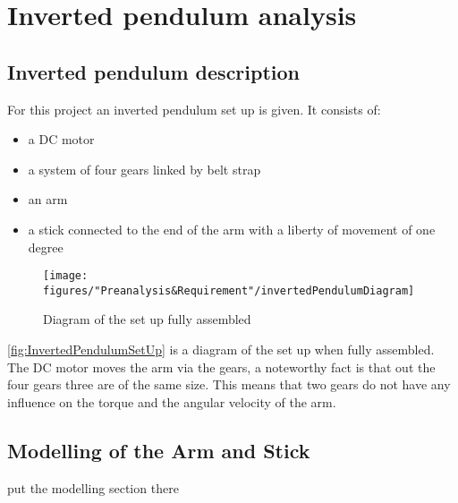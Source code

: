 \chapter{Inverted pendulum analysis}


\section{Inverted pendulum description}
For this project an inverted pendulum set up is given. It consists of:
\begin{itemize}
	\item a DC motor
	\item a system of four gears linked by belt strap
	\item an arm
	\item a stick connected to the end of the arm with a liberty of movement of one degree
\end{itemize}

\begin{figure} [htbp]
	\centering
	\texttt{[image: figures/"Preanalysis\&Requirement"/invertedPendulumDiagram]}
	\caption{Diagram of the set up fully assembled} \label{fig:InvertedPendulumSetUp}
\end{figure}

\autoref{fig:InvertedPendulumSetUp} is a diagram of the set up when fully assembled. The DC motor moves the arm via the gears, a noteworthy fact is that out the four gears three are of the same size. This means that two gears do not have any influence on the torque and the angular velocity of the arm.

\section{Modelling of the Arm and Stick}
put the modelling section there


